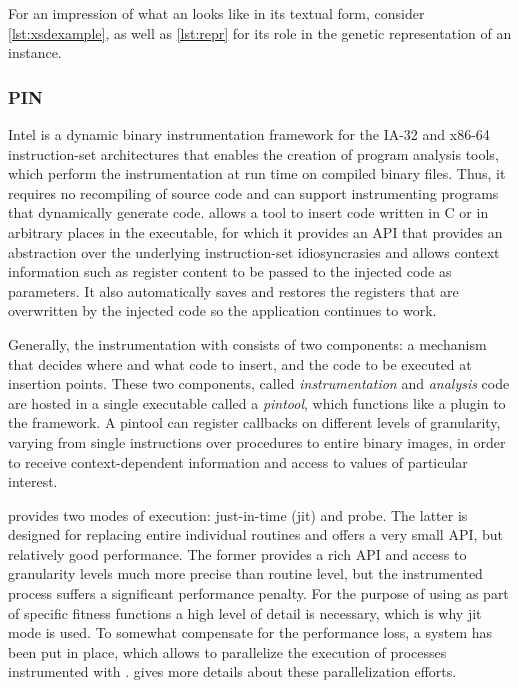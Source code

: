 For an impression of what an \xsd looks like in its textual form, consider \cref{lst:xsdexample},
as well as \cref{lst:repr} for its role in the genetic representation of an \xml instance.
\tocless\subsubsection{PIN}
{\small Intel} \pin\cite{Luk05pin:building} is a dynamic binary instrumentation framework for the IA-32 and x86-64 instruction-set architectures 
that enables the creation of program analysis tools, which perform the instrumentation at run time on  
compiled binary files. Thus, it requires no recompiling of source code and can support instrumenting programs that dynamically generate code.
\pin allows a tool to insert code written in {\small C} or \cpp in arbitrary places in the executable, for which it 
provides an API that provides an abstraction over the underlying instruction-set idiosyncrasies and allows
context information such as register content to be passed to the injected code as parameters. It also
automatically saves and restores the registers that are overwritten by the injected code so the application
continues to work.

Generally, the instrumentation with \pin consists of two components: a mechanism that decides where and what code to insert, 
and the code to be executed at insertion points. These two components, called \emph{instrumentation} and \emph{analysis} 
code are hosted in a single executable called a \emph{pintool}, which functions like a plugin to the \pin framework.
A pintool can register callbacks on different levels of granularity, varying from single instructions over procedures
to entire binary images, in order to receive context-dependent information and access to values of particular interest.

\pin provides two modes of execution: just-in-time (jit) and probe. The latter is designed for replacing
entire individual routines and offers a very small API, but relatively good performance. The former provides
a rich API and access to granularity levels much more precise than routine level, but the instrumented process
suffers a significant performance penalty. For the purpose of using \pin as part of specific fitness functions
a high level of detail is necessary, which is why jit mode is used. To somewhat compensate for the performance
loss, a system has been put in place, which allows to parallelize the execution of processes instrumented with
\pin.  gives more details about these parallelization efforts.

